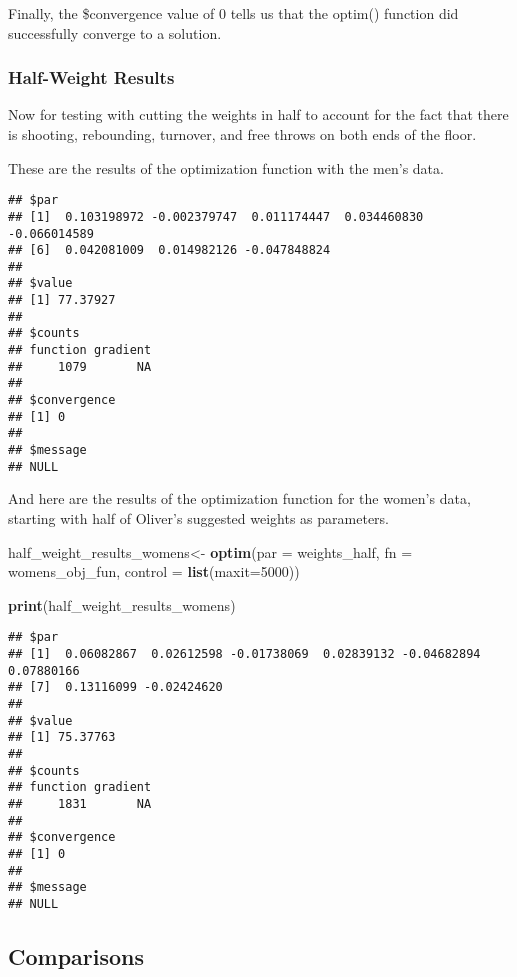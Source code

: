 \documentclass[
]{article}
\newenvironment{Shaded}{\begin{snugshade}}{\end{snugshade}}
\newcommand{\AttributeTok}[1]{\textcolor[rgb]{0.13,0.29,0.53}{#1}}
\newcommand{\DecValTok}[1]{\textcolor[rgb]{0.00,0.00,0.81}{#1}}
\newcommand{\FunctionTok}[1]{\textcolor[rgb]{0.13,0.29,0.53}{\textbf{#1}}}
\newcommand{\NormalTok}[1]{#1}
\newcommand{\OtherTok}[1]{\textcolor[rgb]{0.56,0.35,0.01}{#1}}
\begin{document}
Finally, the \$convergence value of 0 tells us that the optim() function
did successfully converge to a solution.

\subsubsection{Half-Weight Results}\label{half-weight-results}

Now for testing with cutting the weights in half to account for the fact
that there is shooting, rebounding, turnover, and free throws on both
ends of the floor.

These are the results of the optimization function with the men's data.

\begin{verbatim}
## $par
## [1]  0.103198972 -0.002379747  0.011174447  0.034460830 -0.066014589
## [6]  0.042081009  0.014982126 -0.047848824
## 
## $value
## [1] 77.37927
## 
## $counts
## function gradient 
##     1079       NA 
## 
## $convergence
## [1] 0
## 
## $message
## NULL
\end{verbatim}

And here are the results of the optimization function for the women's
data, starting with half of Oliver's suggested weights as parameters.

\begin{Shaded}
\begin{Highlighting}[]
\NormalTok{half\_weight\_results\_womens}\OtherTok{\textless{}{-}} \FunctionTok{optim}\NormalTok{(}\AttributeTok{par =}\NormalTok{ weights\_half, }\AttributeTok{fn =}\NormalTok{ womens\_obj\_fun, }\AttributeTok{control =} \FunctionTok{list}\NormalTok{(}\AttributeTok{maxit=}\DecValTok{5000}\NormalTok{))}

\FunctionTok{print}\NormalTok{(half\_weight\_results\_womens)}
\end{Highlighting}
\end{Shaded}

\begin{verbatim}
## $par
## [1]  0.06082867  0.02612598 -0.01738069  0.02839132 -0.04682894  0.07880166
## [7]  0.13116099 -0.02424620
## 
## $value
## [1] 75.37763
## 
## $counts
## function gradient 
##     1831       NA 
## 
## $convergence
## [1] 0
## 
## $message
## NULL
\end{verbatim}

\subsection{Comparisons}\label{comparisons}
\end{document}
